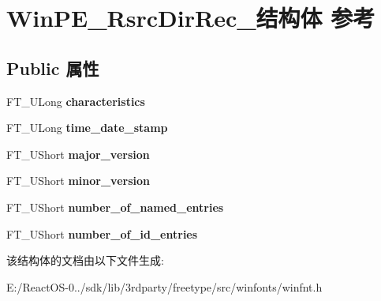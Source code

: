 \hypertarget{struct_win_p_e___rsrc_dir_rec__}{}\section{Win\+P\+E\+\_\+\+Rsrc\+Dir\+Rec\+\_\+结构体 参考}
\label{struct_win_p_e___rsrc_dir_rec__}
\subsection*{Public 属性}
\begin{DoxyCompactItemize}
\item 
\mbox{\label{struct_win_p_e___rsrc_dir_rec___a23f7f2977c1c34c4317741f4fcd6a58a}} 
F\+T\+\_\+\+U\+Long {\bfseries characteristics}
\item 
\mbox{\label{struct_win_p_e___rsrc_dir_rec___a14ef2553ea9390f8643f01b2529e1fdf}} 
F\+T\+\_\+\+U\+Long {\bfseries time\+\_\+date\+\_\+stamp}
\item 
\mbox{\label{struct_win_p_e___rsrc_dir_rec___adfa2f31408fb3f9f3eb1db4de765c2d1}} 
F\+T\+\_\+\+U\+Short {\bfseries major\+\_\+version}
\item 
\mbox{\label{struct_win_p_e___rsrc_dir_rec___a22f220128c743a4802466b4de4bca989}} 
F\+T\+\_\+\+U\+Short {\bfseries minor\+\_\+version}
\item 
\mbox{\label{struct_win_p_e___rsrc_dir_rec___aaa067a8543e2eba18daedff82c2f05cb}} 
F\+T\+\_\+\+U\+Short {\bfseries number\+\_\+of\+\_\+named\+\_\+entries}
\item 
\mbox{\label{struct_win_p_e___rsrc_dir_rec___a4b13483a39573f4bfdff00407c9212b1}} 
F\+T\+\_\+\+U\+Short {\bfseries number\+\_\+of\+\_\+id\+\_\+entries}
\end{DoxyCompactItemize}


该结构体的文档由以下文件生成\+:\begin{DoxyCompactItemize}
\item 
E\+:/\+React\+O\+S-\/0../sdk/lib/3rdparty/freetype/src/winfonts/winfnt.\+h\end{DoxyCompactItemize}
